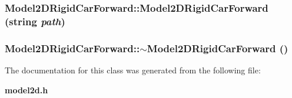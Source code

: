 \subsubsection{\setlength{\rightskip}{0pt plus 5cm}Model2DRigid\-Car\-Forward::Model2DRigid\-Car\-Forward (string {\em path})}\label{class_Model2DRigidCarForward_a0}


\subsubsection{\setlength{\rightskip}{0pt plus 5cm}Model2DRigid\-Car\-Forward::$\sim$Model2DRigid\-Car\-Forward ()\hspace{0.3cm}{\tt  [inline, virtual]}}\label{class_Model2DRigidCarForward_a1}




The documentation for this class was generated from the following file:\begin{CompactItemize}
\item 
{\bf model2d.h}\end{CompactItemize}
